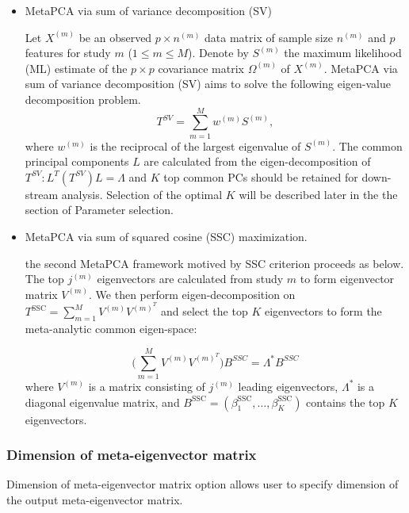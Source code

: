 \begin{itemize}
\item MetaPCA via sum of variance decomposition (SV)

Let $X^{(m)}$ be an observed $p\times n^{(m)}$ data matrix of sample size $n^{(m)}$ and $p$ features for study $m$ 
($1 \leq m\leq M$). 
Denote by $S^{(m)}$ the maximum likelihood (ML) estimate of the $p \times p$ covariance matrix $\Omega^{(m)}$ of $X^{(m)}$. 
MetaPCA via sum of variance decomposition (SV) aims to solve the following eigen-value decomposition problem.
\begin{equation}\label{eq:eq2}
T^{SV}=\sum_{m=1}^M w^{(m)} S^{(m)},
\end{equation}
where $w^{(m)}$ is the reciprocal of the largest eigenvalue of $S^{(m)}$.
The common principal components $L$ are calculated from the eigen-decomposition of $T^{SV}: L^T(T^{SV})L = \Lambda$ and $K$ top common PCs should be retained for down-stream analysis. Selection of the optimal $K$ will be described later in the the section of Parameter selection. 

\item MetaPCA via sum of squared cosine (SSC) maximization.

the second MetaPCA framework motived by SSC criterion proceeds as below.
The top $j^{(m)}$ eigenvectors are calculated from study $m$ to form eigenvector matrix $V^{(m)}$.
We then perform eigen-decomposition on $T^{\mbox{SSC}} = \sum_{m=1}^M V^{(m)} V^{(m)^T}$ and select the top $K$ eigenvectors to form the meta-analytic common eigen-space:

\begin{equation}
\Big (\sum_{m=1}^M V^{(m)} V^{(m)^T} \Big ) B^{SSC} = \Lambda^* B^{SSC}
\end{equation}
where $V^{(m)}$ is a matrix consisting of $j^{(m)}$ leading eigenvectors,
$\Lambda^*$ is a diagonal eigenvalue matrix, and $B^{\mbox{SSC}} = (\beta_1^{\mbox{SSC}}, \dots, \beta_K^{\mbox{SSC}})$ contains the top $K$ eigenvectors.

\end{itemize}

\subsubsection{Dimension of meta-eigenvector matrix}
Dimension of meta-eigenvector matrix option allows user to specify dimension of the output meta-eigenvector matrix.

